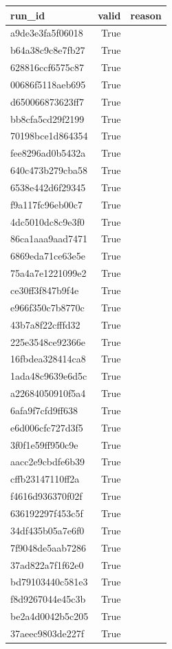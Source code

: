 \begin{tabular}{lrl}
\toprule
run\_id & valid & reason \\
\midrule
a9de3e3fa5f06018 & True &  \\
b64a38c9c8e7fb27 & True &  \\
628816ccf6575c87 & True &  \\
00686f5118aeb695 & True &  \\
d650066873623ff7 & True &  \\
bb8cfa5cd29f2199 & True &  \\
70198bce1d864354 & True &  \\
fee8296ad0b5432a & True &  \\
640c473b279cba58 & True &  \\
6538e442d6f29345 & True &  \\
f9a117fc96eb00c7 & True &  \\
4dc5010dc8c9e3f0 & True &  \\
86ca1aaa9aad7471 & True &  \\
6869eda71ce63e5e & True &  \\
75a4a7e1221099e2 & True &  \\
ce30ff3f847b9f4e & True &  \\
e966f350c7b8770c & True &  \\
43b7a8f22cfffd32 & True &  \\
225e3548ce92366e & True &  \\
16fbdea328414ca8 & True &  \\
1ada48c9639e6d5c & True &  \\
a22684050910f5a4 & True &  \\
6afa9f7cfd9ff638 & True &  \\
e6d006cfc727d3f5 & True &  \\
3f0f1e59ff950c9e & True &  \\
aacc2e9cbdfe6b39 & True &  \\
cffb23147110ff2a & True &  \\
f4616d936370f02f & True &  \\
636192297f453c5f & True &  \\
34df435b05a7e6f0 & True &  \\
7f9048de5aab7286 & True &  \\
37ad822a7f1f62e0 & True &  \\
bd79103440c581e3 & True &  \\
f8d9267044e45c3b & True &  \\
be2a4d0042b5c205 & True &  \\
37aeec9803de227f & True &  \\

\end{tabular}
